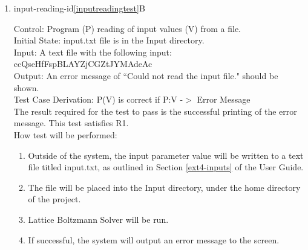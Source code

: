 \documentclass[12pt, titlepage]{article}
\newcommand{\famname}{Lattice Boltzmann Solver}
\begin{document}
\begin{enumerate}
Test Case Derivation: P(V) is correct if P:V -$>$ O and O = V\\

The result required for the test to pass is the successful printing of all input
values to the screen. This test satisfies R1.\\
					
How test will be performed: 

\begin{enumerate}
\item Outside of the system, the input parameter values will be written to a text file titled input.txt, as outlined in Section \ref{ext4-inputs} of the User Guide.
\item The file will be placed into the Input directory, under the home directory
  of the project.
\item The input reading module will be modified to print the input data prior to verifying it.  
\item {\famname} will be run.
\item If successful, The system will output the input parameters to the screen.
\end{enumerate}

\item{input-reading-id\ref{inputreadingtest}B\\}

Control: Program (P) reading of input values (V) from a file.\\

Initial State: input.txt file is in the Input directory.\\

Input: A text file with the following input:\\
ccQseHfFspBLAYZjCGZtJYMAdeAc\\

Output: An error message of ``Could not read the input file." should be shown.\\

Test Case Derivation: P(V) is correct if P:V -$>$ Error Message \\

The result required for the test to pass is the successful printing of the error message. This test satisfies R1.\\

How test will be performed: 

\begin{enumerate}
\item Outside of the system, the input parameter value will be written to a text file titled input.txt, as outlined in Section \ref{ext4-inputs} of the User Guide.
\item The file will be placed into the Input directory, under the home directory
  of the project.
\item {\famname} will be run.
\item If successful, the system will output an error message to the screen.
\end{enumerate}

\end{enumerate}
			
\end{document}
